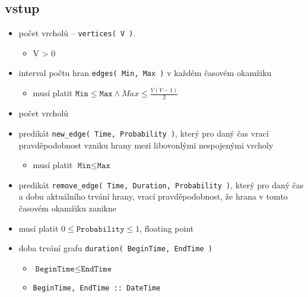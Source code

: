 \documentclass[11pt, a4paper]{article}
\newcommand{\pl}[1]{\texttt{#1}} %
\theoremstyle{plain}
\theoremstyle{definition}
\theoremstyle{remark}
\begin{document}
\subsection{vstup}
\begin{itemize}
    \item počet vrcholů -- \pl{vertices( V )}.
        \begin{itemize}
            \item V > 0
        \end{itemize}
    \item interval počtu hran \pl{edges( Min, Max )} v každém časovém okamžiku
        \begin{itemize}
            \item musí platit $\pl{Min} \le \pl{Max} \land Max \le \frac{ V(V-1)}{2}$
        \end{itemize}
    \item počet vrcholů
    \item predikát \pl{new\_edge( Time, Probability )}, který pro daný čas vrací
          pravděpodobnost vzniku hrany mezi libovonlými nespojenými vrcholy
        \begin{itemize}
            \item musí platit $\pl{Min} \le \pl{Max}$
        \end{itemize}
    \item predikát \pl{remove\_edge( Time, Duration, Probability )}, který pro daný čas
    a dobu aktuálního trvání hrany, vrací pravděpodobnost, že hrana v tomto
    časovém okamžiku zanikne
    \item musí platit $0 \le \pl{Probability} \le 1$, floating point
    \item doba trvání grafu \pl{duration( BeginTime, EndTime )}
        \begin{itemize}
            \item $\pl{BeginTime} \le \pl{EndTime}$
            \item \texttt{BeginTime, EndTime :: DateTime}
        \end{itemize}
\end{itemize}
\end{document}
